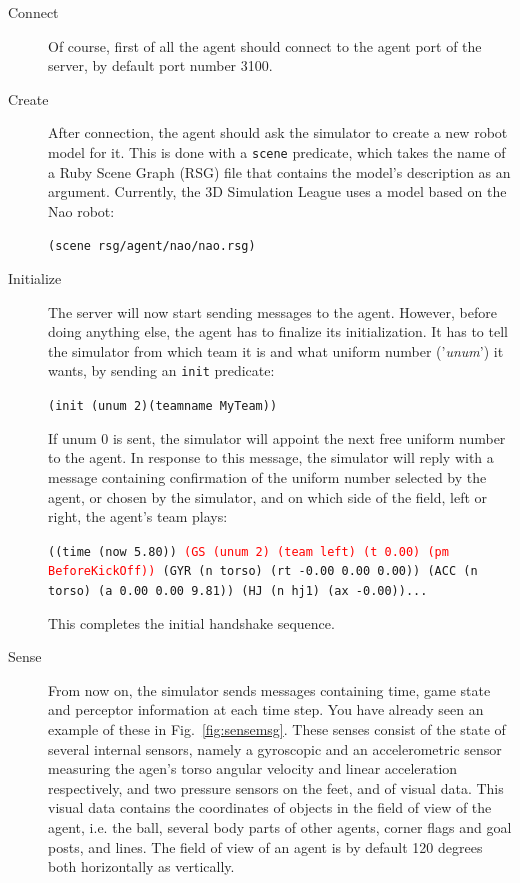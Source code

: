 \begin{description}
	\item[Connect] Of course, first of all the agent should connect to the agent port of the server, by default port number 3100.
	\item[Create] After connection, the agent should ask the simulator to create a new robot model for it. This is done with a {\tt scene} predicate, which takes the name of a Ruby Scene Graph (RSG) file that contains the model's description as an argument. Currently, the 3D Simulation League uses a model based on the Nao robot:
	
	{\tt (scene rsg/agent/nao/nao.rsg)}
	\item[Initialize] The server will now start sending messages to the agent. However, before doing anything else, the agent has to finalize its initialization. It has to tell the simulator from which team it is and what uniform number ('\emph{unum}') it wants, by sending an {\tt init} predicate:
	
	{\tt (init (unum 2)(teamname MyTeam))}
	
	If unum 0 is sent, the simulator will appoint the next free uniform number to the agent. In response to this message, the simulator will reply with a message containing confirmation of the uniform number selected by the agent, or chosen by the simulator, and on which side of the field, left or right, the agent's team plays:
	
	{\tt ((time (now 5.80)) \textcolor{Red}{(GS (unum 2) (team left) (t 0.00) (pm BeforeKickOff))} (GYR (n torso) (rt -0.00 0.00 0.00)) (ACC (n torso) (a 0.00 0.00 9.81)) (HJ (n hj1) (ax -0.00))... }
	
	This completes the initial handshake sequence.
	
	\item[Sense] From now on, the simulator sends messages containing time, game state and perceptor information at each time step. You have already seen an example of these in Fig.~\ref{fig:sensemsg}. These senses consist of the state of several internal sensors, namely a gyroscopic and an accelerometric sensor measuring the agen's torso angular velocity and linear acceleration respectively, and two pressure sensors on the feet, and of visual data. This visual data contains the coordinates of objects in the field of view of the agent, i.e. the ball, several body parts of other agents, corner flags and goal posts, and lines. The field of view of an agent is by default 120 degrees both horizontally as vertically.
	

\end{description}
